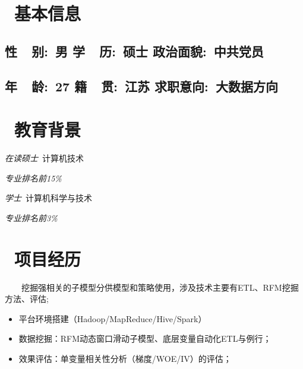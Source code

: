 \documentclass{resume}
\begin{document}



\section{\faLightbulbO\  基本信息}
  \subsection{\hspace{0.4cm} \textbf{性\ \ 别}:\ 男   \hspace{3.5cm}  \textbf{学\ \ 历}:\ 硕士 \hspace{3.5cm}  \textbf{政治面貌}:\ 中共党员}
  
  \subsection{\hspace{0.4cm} \textbf{年\ \ 龄}:\ 27   \hspace{3.5cm}  \textbf{籍\ \ 贯}:\ 江苏 \hspace{3.5cm}  \textbf{求职意向}:\ 大数据方向}
  
\medskip


\section{\faGraduationCap\  教育背景}
\textit{在读硕士}\ 计算机技术 \par
\textit{专业排名前15\%}

\textit{学士}\ 计算机科学与技术 \par
\textit{专业排名前3\%}
\medskip


\section{\faUsers\ 项目经历}

{\ \ \ \ 挖掘强相关的子模型分供模型和策略使用，涉及技术主要有ETL、RFM挖掘方法、评估;}
\begin{itemize}
  \item 平台环境搭建（Hadoop/MapReduce/Hive/Spark）
  \item 数据挖掘：RFM动态窗口滑动子模型、底层变量自动化ETL与例行；
  \item 效果评估：单变量相关性分析（梯度/WOE/IV）的评估；
\end{itemize}
\medskip
\end{document}
